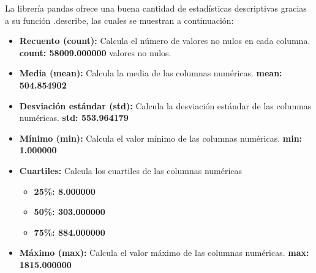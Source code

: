 La librería pandas ofrece una buena cantidad de estadísticas descriptivas gracias a su función .describe, las cuales se muestran a continuación:
\begin{itemize}
    \item \textbf{Recuento (count):} Calcula el número de valores no nulos en cada columna. \textbf{count: 58009.000000} valores no nulos.
    \item \textbf{Media (mean):} Calcula la media de las columnas numéricas. \textbf{mean: 504.854902} 
    \item \textbf{Desviación estándar (std):} Calcula la desviación estándar de las columnas numéricas. \textbf{std: 553.964179}
    \item \textbf{Mínimo (min):} Calcula el valor mínimo de las columnas numéricas. \textbf{min: 1.000000}
    \item \textbf{Cuartiles:} Calcula los cuartiles de las columnas numéricas 
    \begin{itemize}
        \item \textbf{25\%: 8.000000}
        \item \textbf{50\%: 303.000000}
        \item \textbf{75\%: 884.000000}
    \end{itemize}
    \item \textbf{Máximo (max):} Calcula el valor máximo de las columnas numéricas. \textbf{max: 1815.000000}
\end{itemize}
